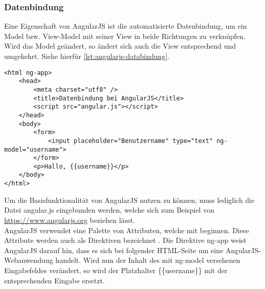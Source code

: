 \subsubsection{Datenbindung}
Eine Eigenschaft von AngularJS ist die automatisierte Datenbindung, um ein Model bzw. View-Model mit seiner View in beide Richtungen zu verknüpfen. Wird das Model geändert, so ändert sich auch die View entsprechend und umgekehrt. Siehe hierfür \autoref{lst:angularjs-databindung}.

\begin{lstlisting}[style=htmlcssjs, caption=Datenbindung bei AngularJS, label=lst:angularjs-databindung]
<html ng-app>
	<head>
		<meta charset="utf8" />
		<title>Datenbindung bei AngularJS</title>
		<script src="angular.js"></script>
	</head>
	<body>
		<form>
			<input placeholder="Benutzername" type="text" ng-model="username">
		</form>
		<p>Hallo, {{username}}</p>
	</body>
</html>
\end{lstlisting}

Um die Basisfunktionalität von AngularJS nutzen zu können, muss lediglich die Datei angular.js eingebunden werden, welche sich zum Beispiel von \url{https://www.angularjs.org} beziehen lässt. \\
AngularJS verwendet eine Palette von Attributen, welche mit  beginnen. Diese Attribute werden auch als Direktiven bezeichnet \cite[S. 40]{ste15}. Die Direktive ng-app weist AngularJS darauf hin, dass es sich bei folgender HTML-Seite um eine AngularJS-Webanwendung handelt. Wird nun der Inhalt des mit ng-model versehenen Eingabefeldes verändert, so wird der Platzhalter \{\{username\}\} mit der entsprechenden Eingabe ersetzt.